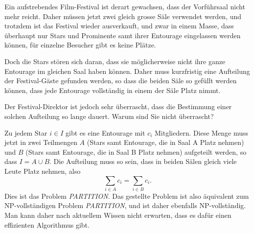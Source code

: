 Ein aufstrebendes Film-Festival ist derart gewachsen, dass der 
Vorführsaal nicht mehr reicht. Daher müssen jetzt zwei gleich
grosse Säle verwendet werden, und trotzdem ist das Festival
wieder ausverkauft, und zwar in einem Masse, dass überhaupt nur Stars und Prominente
samt ihrer Entourage eingelassen werden können, für
einzelne Besucher gibt es keine Plätze.

Doch die Stars stören sich daran, dass sie möglicherweise nicht
ihre ganze Entourage im gleichen Saal haben können. Daher muss
kurzfristig eine Aufteilung der Festival-Gäste gefunden werden,
so dass die beiden Säle so gefüllt werden können, dass
jede Entourage vollständig in einem der Säle Platz nimmt.

Der Festival-Direktor ist jedoch sehr überrascht, dass die
Bestimmung einer solchen Aufteilung so lange dauert. Warum
sind Sie nicht überrascht?


\begin{loesung}
Zu jedem Star $i\in I$ gibt es eine Entourage mit $c_i$
Mitgliedern. Diese Menge muss jetzt in zwei Teilmengen
$A$ (Stars samt Entourage, die in Saal A Platz nehmen) und
$B$ (Stars samt Entourage, die in Saal B Platz nehmen) aufgeteilt
werden, so dass $I=A\cup B$. Die Aufteilung muss so sein, dass
in beiden Sälen gleich viele Leute Platz nehmen, also
\[
\sum_{i\in A}c_i=
\sum_{i\in B}c_i.
\]
Dies ist das Problem {\it PARTITION}. Das gestellte Problem ist also
äquivalent zum NP-vollständigen Problem {\it PARTITION}, und ist
daher ebenfalls NP-vollständig. Man kann daher nach aktuellem
Wissen nicht erwarten, dass es dafür einen effizienten Algorithmus
gibt.
\end{loesung}

